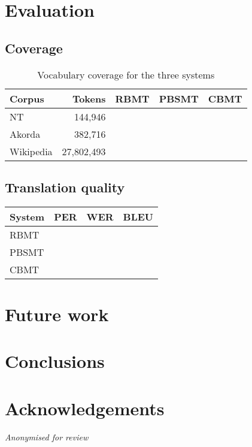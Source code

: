 \documentclass[11pt]{article}
\begin{document}
\section{Evaluation}

\subsection{Coverage}

\begin{table}
  \begin{tabular}{|l|r|r|r|r|}
    \hline
    \textbf{Corpus} & \textbf{Tokens} & \textbf{RBMT} & \textbf{PBSMT} & \textbf{CBMT} \\
    \hline
    NT              & 144,946      &      &          &       \\
    Akorda          & 382,716       &      &          &       \\
    Wikipedia       & 27,802,493       &      &          &       \\
    \hline
  \end{tabular}
  \caption{Vocabulary coverage for the three systems}
  \label{table:coverage}
\end{table}

\subsection{Translation quality}

\begin{table}
  \begin{tabular}{|l|r|r|r|}
    \hline
    \textbf{System} & \textbf{PER} & \textbf{WER} & \textbf{BLEU} \\ 
    \hline
    RBMT            &              &              &               \\
    PBSMT            &              &              &               \\
    CBMT            &              &              &               \\
    \hline  
  \end{tabular}
\end{table}

\section{Future work}

\section{Conclusions}

\section*{Acknowledgements}

\emph{Anonymised for review}



\end{document}
